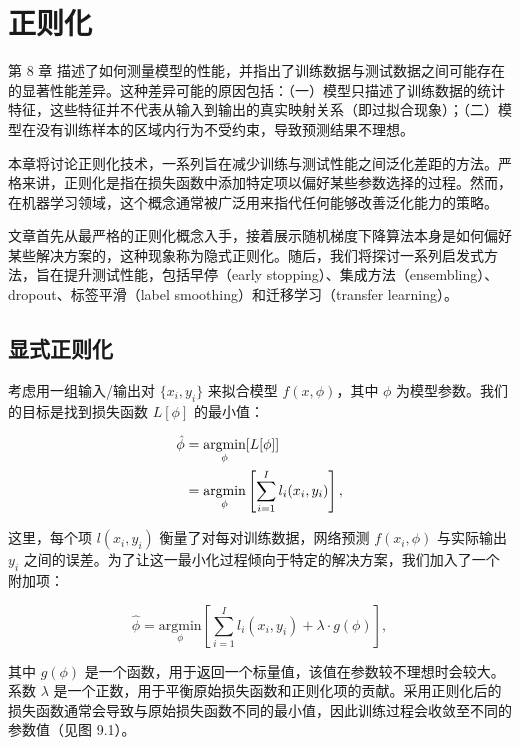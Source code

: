 \documentclass[lang=cn,newtx,10pt,scheme=chinese]{elegantbook}
\begin{document}
\chapter{正则化}


第 8 章 描述了如何测量模型的性能，并指出了训练数据与测试数据之间可能存在的显著性能差异。这种差异可能的原因包括：（一）模型只描述了训练数据的统计特征，这些特征并不代表从输入到输出的真实映射关系（即过拟合现象）；（二）模型在没有训练样本的区域内行为不受约束，导致预测结果不理想。

本章将讨论正则化技术，一系列旨在减少训练与测试性能之间泛化差距的方法。严格来讲，正则化是指在损失函数中添加特定项以偏好某些参数选择的过程。然而，在机器学习领域，这个概念通常被广泛用来指代任何能够改善泛化能力的策略。

文章首先从最严格的正则化概念入手，接着展示随机梯度下降算法本身是如何偏好某些解决方案的，这种现象称为隐式正则化。随后，我们将探讨一系列启发式方法，旨在提升测试性能，包括早停（early stopping）、集成方法（ensembling）、dropout、标签平滑（label smoothing）和迁移学习（transfer learning）。

\section{显式正则化}

考虑用一组输入/输出对 \(\{x_i, y_i\}\) 来拟合模型 \(f(x, \phi)\)，其中 \(\phi\) 为模型参数。我们的目标是找到损失函数 \(L[\phi]\) 的最小值：


\begin{align}
	\hat{\phi} &= \underset{\phi}{\text{argmin}} [L[\phi]] \notag \\
	&= \underset{\phi}{\text{argmin}} \left[ \sum_{i=1}^I l_i(x_i, y_i) \right], 
\end{align} 


这里，每个项 \(l(x_i, y_i)\) 衡量了对每对训练数据，网络预测 \(f(x_i, \phi)\) 与实际输出 \(y_i\) 之间的误差。为了让这一最小化过程倾向于特定的解决方案，我们加入了一个附加项：

\begin{equation}
\hat{\phi} = \underset{\phi}{\text{argmin}} \left[ \sum_{i=1}^I l_i(x_i, y_i) + \lambda \cdot g(\phi) \right], 
\end{equation}

其中 \(g(\phi)\) 是一个函数，用于返回一个标量值，该值在参数较不理想时会较大。系数 \(\lambda\) 是一个正数，用于平衡原始损失函数和正则化项的贡献。采用正则化后的损失函数通常会导致与原始损失函数不同的最小值，因此训练过程会收敛至不同的参数值（见图 9.1）。
\end{document}
